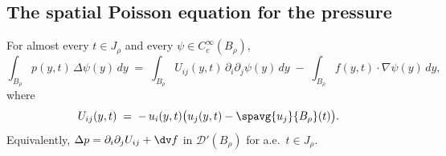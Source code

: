 \documentclass[11pt,reqno]{amsart}
\begin{document}
\subsection{The spatial Poisson equation for the pressure}\label{ss:poisson}

\begin{lemma}\label{lem:delta-p}
For almost every $t\in J_{\rho}$ and every $\psi\in C_{c}^{\infty}(B_{\rho})$,
\begin{equation}\label{eq:delta-p}
  \int_{B_{\rho}}p(y,t)\,\Delta\psi(y)\,dy
  \;=\;\int_{B_{\rho}}U_{ij}(y,t)\,\partial_{i}\partial_{j}\psi(y)\,dy
     \;-\;\int_{B_{\rho}}f(y,t)\cdot\nabla\psi(y)\,dy,
\end{equation}
where
\begin{equation}\label{eq:Uij}
  U_{ij}(y,t)\;=\;-\,u_{i}(y,t)\bigl(u_{j}(y,t)-\spavg{u_{j}}{B_{\rho}}(t)\bigr).
\end{equation}
Equivalently, $\Delta p=\partial_{i}\partial_{j}U_{ij}+\dv f$ in
$\mathcal{D}'(B_{\rho})$ for a.e.\ $t\in J_{\rho}$.
\end{lemma}
\end{document}
